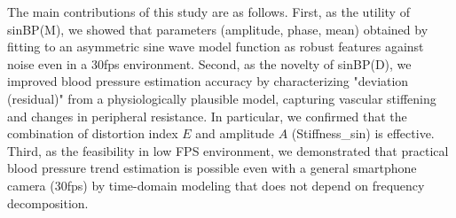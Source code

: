 \documentclass[fleqn,10pt,twocolumn]{AROB}
\begin{document}
The main contributions of this study are as follows. First, as the utility of sinBP(M), we showed that parameters (amplitude, phase, mean) obtained by fitting to an asymmetric sine wave model function as robust features against noise even in a 30fps environment. Second, as the novelty of sinBP(D), we improved blood pressure estimation accuracy by characterizing "deviation (residual)" from a physiologically plausible model, capturing vascular stiffening and changes in peripheral resistance. In particular, we confirmed that the combination of distortion index $E$ and amplitude $A$ (Stiffness\_sin) is effective. Third, as the feasibility in low FPS environment, we demonstrated that practical blood pressure trend estimation is possible even with a general smartphone camera (30fps) by time-domain modeling that does not depend on frequency decomposition.
\end{document}

